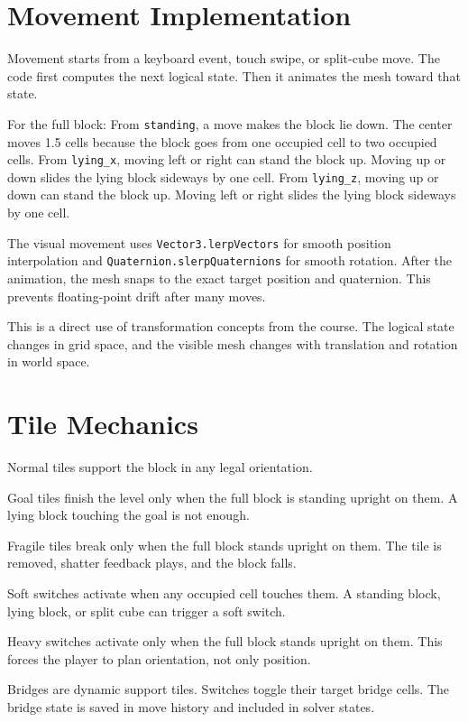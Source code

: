 \documentclass[11pt,a4paper]{article}
\newcommand{\code}[1]{\texttt{#1}}
\begin{document}
\section{Movement Implementation}

Movement starts from a keyboard event, touch swipe, or split-cube move. The code first computes the next logical state. Then it animates the mesh toward that state.

For the full block:
From \code{standing}, a move makes the block lie down. The center moves 1.5 cells because the block goes from one occupied cell to two occupied cells.
From \code{lying\_x}, moving left or right can stand the block up. Moving up or down slides the lying block sideways by one cell.
From \code{lying\_z}, moving up or down can stand the block up. Moving left or right slides the lying block sideways by one cell.

The visual movement uses \code{Vector3.lerpVectors} for smooth position interpolation and \code{Quaternion.slerpQuaternions} for smooth rotation. After the animation, the mesh snaps to the exact target position and quaternion. This prevents floating-point drift after many moves.

This is a direct use of transformation concepts from the course. The logical state changes in grid space, and the visible mesh changes with translation and rotation in world space.

\section{Tile Mechanics}

Normal tiles support the block in any legal orientation.

Goal tiles finish the level only when the full block is standing upright on them. A lying block touching the goal is not enough.

Fragile tiles break only when the full block stands upright on them. The tile is removed, shatter feedback plays, and the block falls.

Soft switches activate when any occupied cell touches them. A standing block, lying block, or split cube can trigger a soft switch.

Heavy switches activate only when the full block stands upright on them. This forces the player to plan orientation, not only position.

Bridges are dynamic support tiles. Switches toggle their target bridge cells. The bridge state is saved in move history and included in solver states.
\end{document}
